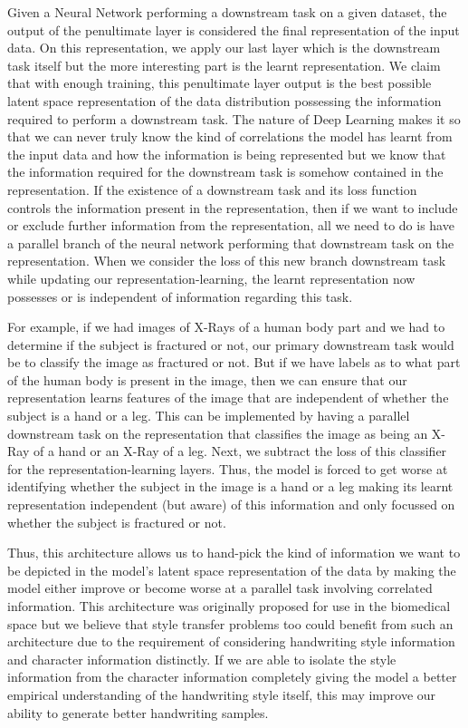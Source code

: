 \documentclass[10pt,twocolumn,letterpaper]{article}
\begin{document}
Given a Neural Network performing a downstream task on a given dataset, the output of the penultimate layer is considered the final representation of the input data. On this representation, we apply our last layer which is the downstream task itself but the more interesting part is the learnt representation. We claim that with enough training, this penultimate layer output is the best possible latent space representation of the data distribution possessing the information required to perform a downstream task. The nature of Deep Learning makes it so that we can never truly know the kind of correlations the model has learnt from the input data and how the information is being represented but we know that the information required for the downstream task is somehow contained in the representation. If the existence of a downstream task and its loss function controls the information present in the representation, then if we want to include or exclude further information from the representation, all we need to do is have a parallel branch of the neural network performing that downstream task on the representation. When we consider the loss of this new branch downstream task while updating our representation-learning, the learnt representation now possesses or is independent of information regarding this task.

For example, if we had images of X-Rays of a human body part and we had to determine if the subject is fractured or not, our primary downstream task would be to classify the image as fractured or not. But if we have labels as to what part of the human body is present in the image, then we can ensure that our representation learns features of the image that are independent of whether the subject is a hand or a leg. This can be implemented by having a parallel downstream task on the representation that classifies the image as being an X-Ray of a hand or an X-Ray of a leg. Next, we subtract the loss of this classifier for the representation-learning layers. Thus, the model is forced to get worse at identifying whether the subject in the image is a hand or a leg making its learnt representation independent (but aware) of this information and only focussed on whether the subject is fractured or not.

Thus, this architecture allows us to hand-pick the kind of information we want to be depicted in the model's latent space representation of the data by making the model either improve or become worse at a parallel task involving correlated information. This architecture was originally proposed for use in the biomedical space but we believe that style transfer problems too could benefit from such an architecture due to the requirement of considering handwriting style information and character information distinctly. If we are able to isolate the style information from the character information completely giving the model a better empirical understanding of the handwriting style itself, this may improve our ability to generate better handwriting samples.


{\small


}
\end{document}
